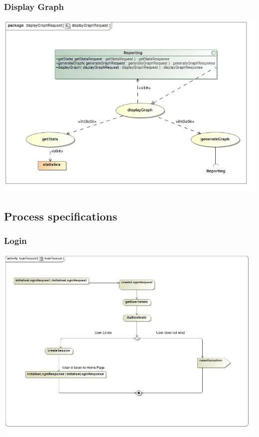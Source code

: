 \documentclass[a4paper,12pt]{article}
\begin{document}
\subsubsection{Display Graph}
\includegraphics[width=1\textwidth]{./Images/requiredFunctionality/displayGraphRequestUseCase.jpg}


\subsection{Process specifications}
\subsubsection{Login}
\includegraphics[width=1\textwidth]{./Images/processSpecification/Priscilla/loginRequest.jpg}
\end{document}
